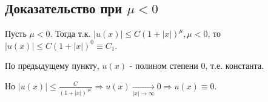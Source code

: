 \subsection{Доказательство при $\mu < 0$}

Пусть $\mu<0$. Тогда т.к. $|u(x)|\le C(1+|x|)^\mu, \mu<0$, то
$|u(x)| \le C (1+|x|)^0 \equiv C_1$. 

По предыдущему пункту, $u(x)$ - полином степени 0, т.е. константа.

Но $|u(x)| \le \frac{C}{(1+|x|)^{|\mu|}} \Rightarrow u(x) 
\underset{|x| \to \infty}{\longrightarrow}
0   \Rightarrow u(x) \equiv 0$.
 
